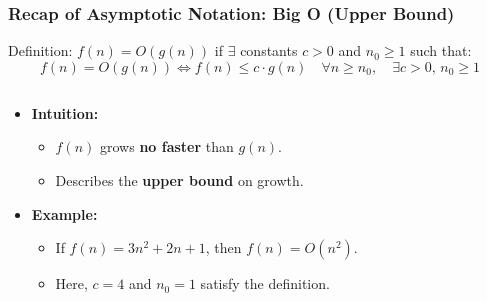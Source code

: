 \documentclass[10pt,aspectratio=43]{beamer}
\begin{document}

\begin{frame}
  \frametitle{Recap of Asymptotic Notation: Big O (Upper Bound)}

  \begin{block}{Definition:} $f(n) = O(g(n))$ if $\exists$ constants $c > 0$ and $n_0 \geq 1$ such that:
\[
f(n) = O(g(n)) \iff  f(n) \leq c \cdot g(n) \quad \forall n \geq n_0, \quad \exists c > 0, \, n_0 \geq 1
\]
        \end{block}
          \begin{columns}

    \begin{column}{0.7\textwidth}
      \begin{itemize}
        \item \textbf{Intuition:}
        \begin{itemize}
            \item \( f(n) \) grows \textbf{no faster} than \( g(n) \).
            \vspace{3pt}
            \item Describes the \textbf{upper bound} on growth.
        \end{itemize}
        
        \item \textbf{Example:}
        \begin{itemize}
            \item If \( f(n) = 3n^2 + 2n + 1 \), then \( f(n) = O(n^2) \).
            \vspace{3pt}
            \item Here, \( c = 4 \) and \( n_0 = 1 \) satisfy the definition.
        \end{itemize}
      \end{itemize}
    \end{column}


\end{columns}
\end{frame}
\end{document}
